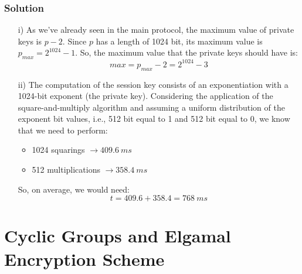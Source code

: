 \documentclass[11pt, a4paper]{article}
\begin{document}
\subsubsection*{Solution}
\begin{itemize}
    \item[i)] As we've already seen in the main protocol, the maximum value of private keys is $p-2$. Since $p$ has a length of 1024 bit, its maximum value is $p_{max}=2^{1024}-1$. So, the maximum value that the private keys should have is:
    $$max=p_{max}-2=2^{1024}-3$$
    \item[ii)] The computation of the session key consists of an exponentiation with a 1024-bit exponent (the private key). Considering the application of the square-and-multiply algorithm and assuming a uniform distribution of the exponent bit values, i.e., 512 bit equal to 1 and 512 bit equal to 0, we know that we need to perform:
    \begin{itemize}
        \item 1024 squarings $\longrightarrow409.6\ ms$
        \item 512 multiplications $\longrightarrow358.4\ ms$
    \end{itemize}
    So, on average, we would need:
    $$t=409.6+358.4=768\ ms$$
\end{itemize}

\newpage
\section{Cyclic Groups and Elgamal Encryption Scheme}
\end{document}
